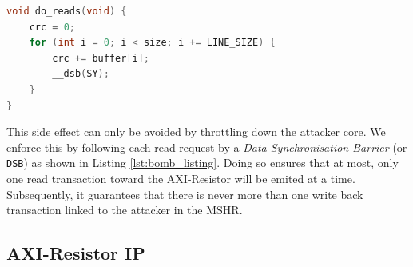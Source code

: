         \begin{lstlisting}[language=C, caption={Read memory-bomb code}, label={lst:bomb_listing}, basicstyle=\small, captionpos=b]
void do_reads(void) {
    crc = 0;
    for (int i = 0; i < size; i += LINE_SIZE) {
        crc += buffer[i];
        __dsb(SY);
    }
}
        \end{lstlisting}

        This side effect can only be avoided by throttling down the attacker core. We enforce this by following each read request by a \emph{Data Synchronisation Barrier} (or \texttt{DSB}) as shown in Listing \ref{lst:bomb_listing}. Doing so ensures that at most, only one read transaction toward the AXI-Resistor will be emited at a time. Subsequently, it guarantees that there is never more than one write back transaction linked to the attacker in the MSHR.

    \subsection{AXI-Resistor IP}
        \label{subsec:axi-resistor}

